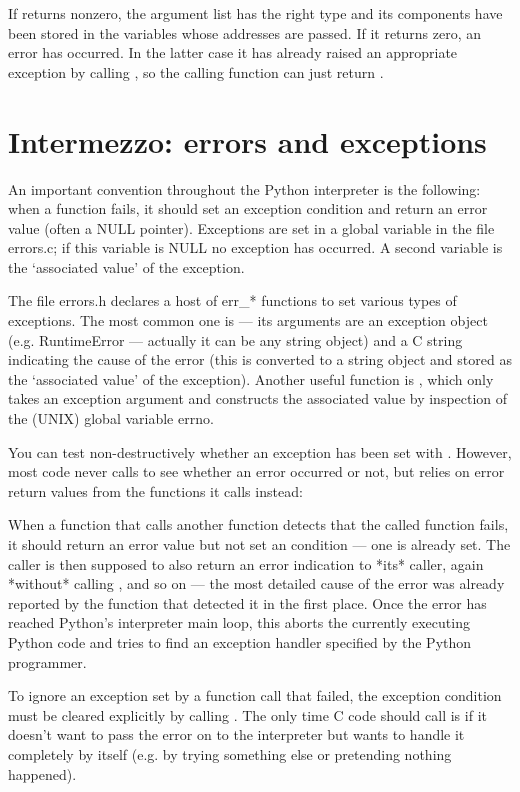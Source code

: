 If  returns nonzero, the argument list has the right
type and its components have been stored in the variables whose
addresses are passed.  If it returns zero, an error has occurred.  In
the latter case it has already raised an appropriate exception by
calling , so the calling function can just return
.


\section{Intermezzo: errors and exceptions}

An important convention throughout the Python interpreter is the
following: when a function fails, it should set an exception condition
and return an error value (often a NULL pointer).  Exceptions are set
in a global variable in the file errors.c; if this variable is NULL no
exception has occurred.  A second variable is the `associated value'
of the exception.

The file errors.h declares a host of err_* functions to set various
types of exceptions.  The most common one is  --- its
arguments are an exception object (e.g. RuntimeError --- actually it
can be any string object) and a C string indicating the cause of the
error (this is converted to a string object and stored as the
`associated value' of the exception).  Another useful function is
, which only takes an exception argument and
constructs the associated value by inspection of the (UNIX) global
variable errno.

You can test non-destructively whether an exception has been set with
.  However, most code never calls
 to see whether an error occurred or not, but
relies on error return values from the functions it calls instead:

When a function that calls another function detects that the called
function fails, it should return an error value but not set an
condition --- one is already set.  The caller is then supposed to also
return an error indication to *its* caller, again *without* calling
, and so on --- the most detailed cause of the error
was already reported by the function that detected it in the first
place.  Once the error has reached Python's interpreter main loop,
this aborts the currently executing Python code and tries to find an
exception handler specified by the Python programmer.

To ignore an exception set by a function call that failed, the
exception condition must be cleared explicitly by calling
.  The only time C code should call
 is if it doesn't want to pass the error on to the
interpreter but wants to handle it completely by itself (e.g. by
trying something else or pretending nothing happened).

